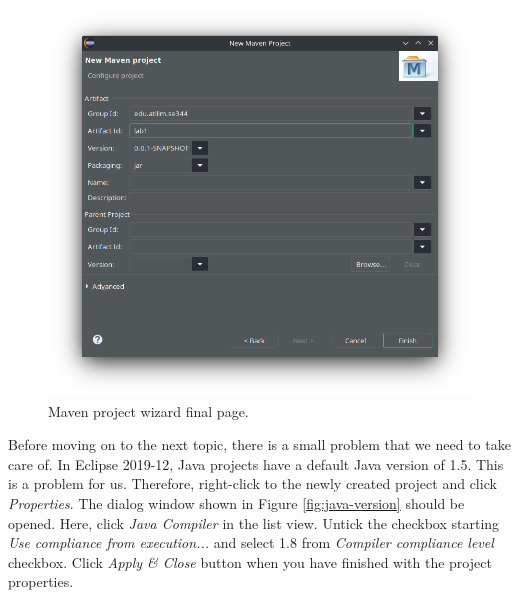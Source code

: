 \begin{figure}[H]
    \centering
    \includegraphics[width=\textwidth]{images/maven-app-conf.png}
    \caption{Maven project wizard final page.}
    \label{fig:maven-app-conf}
\end{figure}

Before moving on to the next topic, there is a small problem that we need to take care of. In Eclipse 2019-12, Java projects have a default Java version of 1.5. This is a problem for us. Therefore, right-click to the newly created project and click \emph{Properties}. The dialog window shown in Figure \ref{fig:java-version} should be opened. Here, click \emph{Java Compiler} in the list view. Untick the checkbox starting \emph{Use compliance from execution...} and select 1.8 from \emph{Compiler compliance level} checkbox. Click \emph{Apply \& Close} button when you have finished with the project properties.

